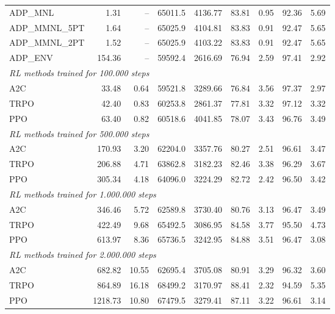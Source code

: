 \begin{samepage}
\begin{center}
\begin{tabular}{l|rr|rr|rr|rr}
    \midrule
    ADP\_MNL     &     1.31 &    -- &    65011.5 &    4136.77 &   83.81 &    0.95 &   92.36 &    5.69 \\
    ADP\_MMNL\_5PT &     1.64 &    -- &    65025.9 &    4104.81 &   83.83 &    0.91 &   92.47 &    5.65 \\
    ADP\_MMNL\_2PT &     1.52 &    -- &    65025.9 &    4103.22 &   83.83 &    0.91 &   92.47 &    5.65 \\
    ADP\_ENV     &   154.36 &    -- &    59592.4 &    2616.69 &   76.94 &    2.59 &   97.41 &    2.92 \\
    \midrule
    \multicolumn{9}{l}{\textit{RL methods trained for 100.000 steps}} \\
    \midrule
    A2C          &    33.48 &     0.64 &    59521.8 &    3289.66 &   76.84 &    3.56 &   97.37 &    2.97 \\
    TRPO         &    42.40 &     0.83 &    60253.8 &    2861.37 &   77.81 &    3.32 &   97.12 &    3.32 \\
    PPO          &    63.40 &     0.82 &    60518.6 &    4041.85 &   78.07 &    3.43 &   96.76 &    3.49 \\
    \midrule
    \multicolumn{9}{l}{\textit{RL methods trained for 500.000 steps}} \\
    \midrule
    A2C          &   170.93 &     3.20 &    62204.0 &    3357.76 &   80.27 &    2.51 &   96.61 &    3.47 \\
    TRPO         &   206.88 &     4.71 &    63862.8 &    3182.23 &   82.46 &    3.38 &   96.29 &    3.67 \\
    PPO          &   305.34 &     4.18 &    64096.0 &    3224.29 &   82.72 &    2.42 &   96.50 &    3.42 \\
    \midrule
    \multicolumn{9}{l}{\textit{RL methods trained for 1.000.000 steps}} \\
    \midrule
    A2C          &   346.46 &     5.72 &    62589.8 &    3730.40 &   80.76 &    3.13 &   96.47 &    3.49 \\
    TRPO         &   422.49 &     9.68 &    65492.5 &    3086.95 &   84.58 &    3.77 &   95.50 &    4.73 \\
    PPO          &   613.97 &     8.36 &    65736.5 &    3242.95 &   84.88 &    3.51 &   96.47 &    3.08 \\
    \midrule
    \multicolumn{9}{l}{\textit{RL methods trained for 2.000.000 steps}} \\
    \midrule
    A2C          &   682.82 &    10.55 &    62695.4 &    3705.08 &   80.91 &    3.29 &   96.32 &    3.60 \\
    TRPO         &   864.89 &    16.18 &    68499.2 &    3170.97 &   88.41 &    2.32 &   94.59 &    5.35 \\
    PPO          &  1218.73 &    10.80 &    67479.5 &    3279.41 &   87.11 &    3.22 &   96.61 &    3.14 \\
    \bottomrule
  \end{tabular}
\end{center}
\end{samepage}

